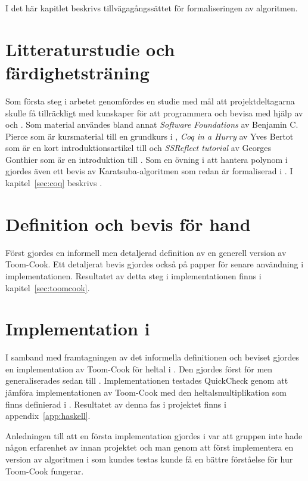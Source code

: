 I det här kapitlet beskrivs tillvägagångssättet för formaliseringen av algoritmen.

\section{Litteraturstudie och färdighetsträning}
Som första steg i arbetet genomfördes en studie med mål att projektdeltagarna
skulle få tillräckligt med kunskaper för att programmera och bevisa med hjälp
av \coq{} och \ssr{}. Som material användes bland annat \emph{Software
Foundations} av Benjamin C. Pierce som är kursmaterial till en grundkurs i
\coq{}\cite{pierce2012software}, \emph{Coq in a Hurry} av Yves Bertot som är en
kort introduktionsartikel till \coq{}\cite{bertot2006coq} och \emph{SSReflect
tutorial} av Georges Gonthier som är en introduktion till \ssr{}
\cite{gonthier2009ssreflect}. Som en övning i att hantera polynom i \ssr
gjordes även ett bevis av Karatsuba-algoritmen som redan är formaliserad i
\coq{}. I kapitel~\ref{sec:coq} beskrivs \coq.

\section{Definition och bevis för hand}
Först gjordes en informell men detaljerad definition av en generell version av
Toom-Cook. Ett detaljerat bevis gjordes också på papper för senare användning i
implementationen. Resultatet av detta steg i implementationen finns i
kapitel~\ref{sec:toomcook}.

\section{Implementation i \haskell{}}
I samband med framtagningen av det informella definitionen och beviset gjordes
en implementation av Toom-Cook för heltal i \haskell{}. Den gjordes först för
 men generaliserades sedan till . Implementationen testades
QuickCheck genom att jämföra implementationen av Toom-Cook med den
heltalsmultiplikation som finns definierad i \haskell{}. Resultatet av denna
fas i projektet finns i appendix~\ref{app:haskell}.

Anledningen till att en första implementation gjordes i \haskell{} var att
gruppen inte hade någon erfarenhet av \coq{} innan projektet och man genom att
först implementera en version av algoritmen i \haskell{} som kundes testas
kunde få en bättre förståelse för hur Toom-Cook fungerar.

